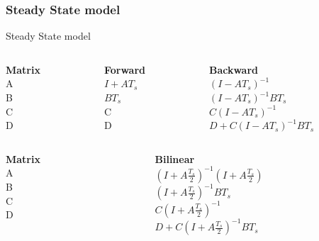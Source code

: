 \begin{frame}
	\frametitle{Steady State model}
	\begin{block}{Steady State model}
		\begin{columns}
			\begin{column}{0.1\textwidth}
				\textbf{Matrix}\\
				A\\
				B\\
				C\\
				D
			\end{column}
			\begin{column}{0.15\textwidth}
				\textbf{Forward}\\
				$I + AT_s$\\
				$BT_s$\\
				C\\
				D
			\end{column}
			\begin{column}{0.35\textwidth}
				\textbf{Backward}\\
				$(I - AT_s)^{-1}$\\
				$(I - AT_s)^{-1}BT_s$\\
				$C(I - AT_s)^{-1}$\\
				$D + C(I - AT_s)^{-1}BT_s$
			\end{column}
		\end{columns}
		\vspace{1em}
		\begin{columns}
			\begin{column}{0.1\textwidth}
				\textbf{Matrix}\\
				A\\
				B\\
				C\\
				D
			\end{column}
			\begin{column}{0.65\textwidth}
				\textbf{Bilinear}\\
				$(I+A\frac{T_s}{2})^{-1} (I+A\frac{T_s}{2})$\\
				$(I+A\frac{T_s}{2})^{-1}BT_s$\\
				$C(I+A\frac{T_s}{2})^{-1}$\\
				$D + C(I+A\frac{T_s}{2})^{-1}BT_s$
			\end{column}	
		\end{columns}
	\end{block}
\end{frame}

